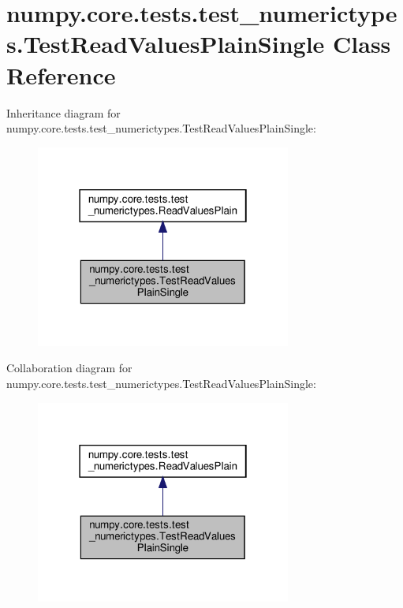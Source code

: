 \hypertarget{classnumpy_1_1core_1_1tests_1_1test__numerictypes_1_1TestReadValuesPlainSingle}{}\section{numpy.\+core.\+tests.\+test\+\_\+numerictypes.\+Test\+Read\+Values\+Plain\+Single Class Reference}
\label{classnumpy_1_1core_1_1tests_1_1test__numerictypes_1_1TestReadValuesPlainSingle}


Inheritance diagram for numpy.\+core.\+tests.\+test\+\_\+numerictypes.\+Test\+Read\+Values\+Plain\+Single\+:
\nopagebreak
\begin{figure}[H]
\begin{center}
\leavevmode
\includegraphics[width=238pt]{classnumpy_1_1core_1_1tests_1_1test__numerictypes_1_1TestReadValuesPlainSingle__inherit__graph}
\end{center}
\end{figure}


Collaboration diagram for numpy.\+core.\+tests.\+test\+\_\+numerictypes.\+Test\+Read\+Values\+Plain\+Single\+:
\nopagebreak
\begin{figure}[H]
\begin{center}
\leavevmode
\includegraphics[width=238pt]{classnumpy_1_1core_1_1tests_1_1test__numerictypes_1_1TestReadValuesPlainSingle__coll__graph}
\end{center}
\end{figure}
